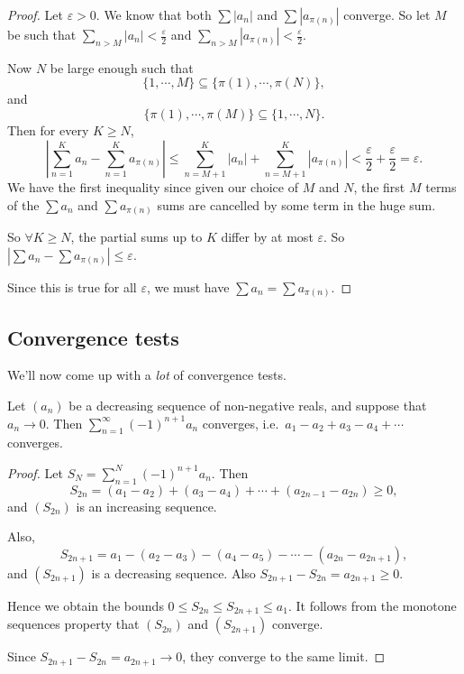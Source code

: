 \documentclass[a4paper]{article}
\begin{document}
\begin{proof}
  Let $\varepsilon > 0$. We know that both $\sum |a_n|$ and $\sum|a_{\pi(n)}|$ converge. So let $M$ be such that $\sum_{n > M}|a_n| < \frac{\varepsilon}{2}$ and $\sum_{n > M}|a_{\pi(n)}| < \frac{\varepsilon}{2}$.

  Now $N$ be large enough such that
  \[
    \{1, \cdots, M\}\subseteq \{\pi(1), \cdots, \pi(N)\},
  \]
  and
  \[
    \{\pi(1), \cdots, \pi(M)\}\subseteq \{1, \cdots, N\}.
  \]
  Then for every $K\geq N$,
  \[
    \left|\sum_{n = 1}^K a_n - \sum_{n = 1}^K a_{\pi(n)}\right| \leq \sum_{n = M + 1}^K |a_n| + \sum_{n = M + 1}^K |a_{\pi(n)}| < \frac{\varepsilon}{2} + \frac{\varepsilon}{2} = \varepsilon.
  \]
  We have the first inequality since given our choice of $M$ and $N$, the first $M$ terms of the $\sum a_n$ and $\sum a_{\pi(n)}$ sums are cancelled by some term in the huge sum.

  So $\forall K \geq N$, the partial sums up to $K$ differ by at most $\varepsilon$. So $|\sum a_n - \sum a_{\pi(n)}| \leq \varepsilon$.

  Since this is true for all $\varepsilon$, we must have $\sum a_n = \sum a_{\pi(n)}$.
\end{proof}

\subsection{Convergence tests}
We'll now come up with a \emph{lot} of convergence tests.
\begin{lemma}
  Let $(a_n)$ be a decreasing sequence of non-negative reals, and suppose that $a_n \to 0$. Then $\displaystyle \sum_{n = 1}^\infty (-1)^{n + 1}a_n$ converges, i.e.\ $a_1 - a_2 + a_3 - a_4 + \cdots$ converges.
\end{lemma}

\begin{proof}
  Let $\displaystyle S_N = \sum_{n = 1}^N(-1)^{n + 1}a_n$. Then
  \[
    S_{2n} = (a_1 - a_2) + (a_3 - a_4) + \cdots + (a_{2n - 1} - a_{2n}) \geq 0,
  \]
  and $(S_{2n})$ is an increasing sequence.

  Also,
  \[
    S_{2n + 1} = a_1 - (a_2 - a_3) - (a_4 - a_5) - \cdots - (a_{2n} - a_{2n + 1}),
  \]
  and $(S_{2n + 1})$ is a decreasing sequence. Also $S_{2n + 1} - S_{2n} = a_{2n + 1} \geq 0$.

  Hence we obtain the bounds $0 \leq S_{2n} \leq S_{2n + 1} \leq a_1$. It follows from the monotone sequences property that $(S_{2n})$ and $(S_{2n + 1})$ converge.

  Since $S_{2n + 1} - S_{2n} = a_{2n + 1} \to 0$, they converge to the same limit.
\end{proof}
\end{document}

